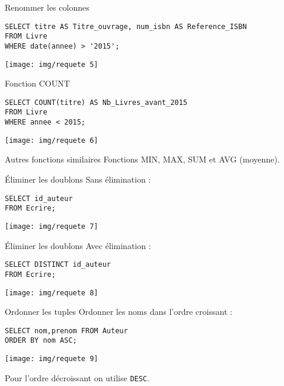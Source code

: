 \documentclass[10pt]{beamer}
\begin{document}
\begin{frame}[fragile]{Renommer les colonnes}
	\begin{verbatim}
SELECT titre AS Titre_ouvrage, num_isbn AS Reference_ISBN
FROM Livre
WHERE date(annee) > '2015';
    \end{verbatim}
    \pause
    \begin{center}
    \texttt{[image: img/requete 5]}
    \end{center}
\end{frame}

\begin{frame}[fragile]{Fonction COUNT}
	\begin{verbatim}
SELECT COUNT(titre) AS Nb_Livres_avant_2015
FROM Livre
WHERE annee < 2015;    \end{verbatim}
\pause
    \begin{center}
    \texttt{[image: img/requete 6]}
    \end{center}
\end{frame}
\begin{frame}{Autres fonctions similaires}
	Fonctions MIN, MAX, SUM et AVG (moyenne).
\end{frame}
\begin{frame}[fragile]{\'Eliminer les doublons}
Sans élimination :
	\begin{verbatim}
SELECT id_auteur
FROM Ecrire;
    \end{verbatim}
    \pause
    \begin{center}
    \texttt{[image: img/requete 7]}
    \end{center}
\end{frame}

\begin{frame}[fragile]{\'Eliminer les doublons}
Avec élimination :
	\begin{verbatim}
SELECT DISTINCT id_auteur
FROM Ecrire;
    \end{verbatim}
    \pause
    \begin{center}
    \texttt{[image: img/requete 8]}
    \end{center}
\end{frame}

\begin{frame}[fragile]{Ordonner les tuples}
Ordonner les noms dans l'ordre croissant :
	\begin{verbatim}
SELECT nom,prenom FROM Auteur
ORDER BY nom ASC;
    \end{verbatim}
    \pause
    \begin{center}
    \texttt{[image: img/requete 9]}
    \end{center}\pause
    Pour l'ordre décroissant on utilise \texttt{DESC}.
\end{frame}
\end{document}
